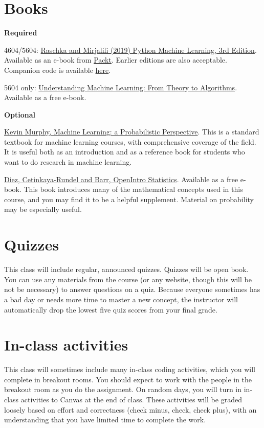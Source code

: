 \documentclass[10pt]{memoir}
\begin{document}
\section{\textbf{Books}}

\textbf{Required}

4604/5604: \href{https://sebastianraschka.com/books.html}{Raschka and Mirjalili (2019) Python Machine Learning, 3rd Edition}. Available as an e-book from \href{https://www.packtpub.com/data/python-machine-learning-third-edition}{Packt}. Earlier editions are also acceptable. Companion code is available \href{https://github.com/rasbt/python-machine-learning-book-3rd-edition}{here}.
 
5604 only: \href{https://www.cs.huji.ac.il/~shais/UnderstandingMachineLearning/copy.html}{Understanding Machine Learning: From Theory to Algorithms}. Available as a free e-book.

\textbf{Optional}

\href{https://www.cs.ubc.ca/~murphyk/MLbook/}{Kevin Murphy, Machine Learning: a Probabilistic Perspective}. This is a standard textbook for machine learning courses, with comprehensive coverage of the field. It is useful both as an introduction and as a reference book for students who want to do research in machine learning.

\href{https://www.abehandler.com/resources/openintro-statistics.pdf}{Diez, Cetinkaya-Rundel and Barr, OpenIntro Statistics}. Available as a free e-book. This book introduces many of the mathematical concepts used in this course, and you may find it to be a helpful supplement. Material on probability may be especially useful.

\section{\textbf{Quizzes}}

This class will include regular, announced quizzes. Quizzes will be open book. You can use any materials from the course (or any website, though this will be not be necessary) to answer questions on a quiz. Because everyone sometimes has a bad day or needs more time to master a new concept, the instructor will automatically drop the lowest five quiz scores from your final grade. 

\section{\textbf{In-class activities}}
This class will sometimes include many in-class coding activities, which you will complete in breakout rooms. You should expect to work with the people in the breakout room as you do the assignment. On random days, you will turn in in-class activities to Canvas at the end of class. These activities will be graded loosely based on effort and correctness (check minus, check, check plus), with an understanding that you have limited time to complete the work. 
\end{document}

